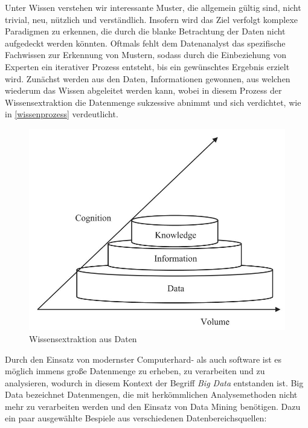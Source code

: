\glqq Unter Wissen verstehen wir interessante Muster, die allgemein gültig sind, nicht trivial, neu, nützlich und verständlich.\grqq{} Insofern wird das Ziel verfolgt komplexe Paradigmen zu erkennen, die durch die blanke Betrachtung der Daten nicht aufgedeckt werden könnten. Oftmals fehlt dem Datenanalyst das spezifische Fachwissen zur Erkennung von Mustern, sodass durch die Einbeziehung von Experten ein iterativer Prozess entsteht, bis ein gewünschtes Ergebnis erzielt wird. Zunächst werden aus den Daten, Informationen gewonnen, aus welchen wiederum das Wissen abgeleitet werden kann, wobei in diesem Prozess der Wissensextraktion die Datenmenge sukzessive abnimmt und sich verdichtet, wie in \vref{wissenprozess} verdeutlicht.

\begin{figure}[H]
\centering
\includegraphics[scale=1.3]{se-wa-jpg/wissenprozess}
\caption[Wissensextraktion aus Daten]{Wissensextraktion aus Daten\protect\footnotemark}
\label{wissenprozess}
\end{figure}


Durch den Einsatz von modernster Computerhard- als auch software ist es möglich immens große Datenmenge zu erheben, zu verarbeiten und zu analysieren, wodurch in diesem Kontext der Begriff \textit{Big Data} entstanden ist. Big Data bezeichnet Datenmengen, die mit herkömmlichen Analysemethoden nicht mehr zu verarbeiten werden und den Einsatz von Data Mining benötigen. Dazu ein paar ausgewählte Bespiele aus verschiedenen Datenbereichsquellen:

